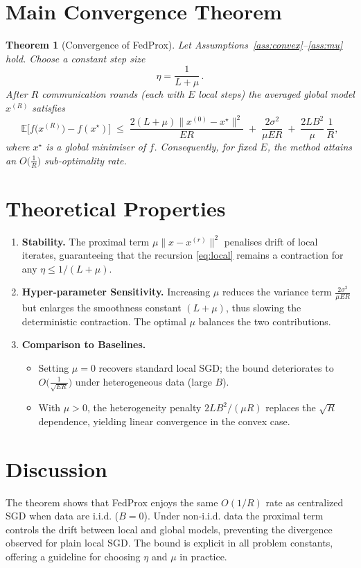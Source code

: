 \documentclass{article}
\newtheorem{theorem}{Theorem}
\newcommand{\E}{\mathbb{E}}
\begin{document}
\section*{Main Convergence Theorem}
\begin{theorem}[Convergence of FedProx]\label{thm:main}
Let Assumptions~\ref{ass:convex}–\ref{ass:mu} hold.  
Choose a constant step size
\[
\eta = \frac{1}{L+\mu}\, .
\]
After $R$ communication rounds (each with $E$ local steps) the averaged global model $x^{(R)}$ satisfies
\[
\E\!\big[ f\!\big(x^{(R)}\big)-f(x^\star) \big]
\;\le\;
\frac{2 (L+\mu)\|x^{(0)}-x^\star\|^2}{ER}
\;+\;
\frac{2\sigma^2}{\mu ER}
\;+\;
\frac{2L B^2}{\mu}\,\frac{1}{R},
\tag{3}
\]
where $x^\star$ is a global minimiser of $f$.  
Consequently, for fixed $E$, the method attains an $O\!\big(\tfrac{1}{R}\big)$ sub‑optimality rate.
\end{theorem}

\section*{Theoretical Properties}
\begin{enumerate}[label=\arabic*.]
\item \textbf{Stability.} The proximal term $\mu\|x-x^{(r)}\|^2$ penalises drift of local iterates, guaranteeing that the recursion \eqref{eq:local} remains a contraction for any $\eta\le1/(L+\mu)$.
\item \textbf{Hyper‑parameter Sensitivity.} Increasing $\mu$ reduces the variance term $\frac{2\sigma^2}{\mu ER}$ but enlarges the smoothness constant $(L+\mu)$, thus slowing the deterministic contraction. The optimal $\mu$ balances the two contributions.
\item \textbf{Comparison to Baselines.}
    \begin{itemize}
        \item Setting $\mu=0$ recovers standard local SGD; the bound deteriorates to $O\big(\tfrac{1}{\sqrt{ER}}\big)$ under heterogeneous data (large $B$).
        \item With $\mu>0$, the heterogeneity penalty $2L B^2/(\mu R)$ replaces the $\sqrt{R}$ dependence, yielding linear convergence in the convex case.
    \end{itemize}
\end{enumerate}

\section*{Discussion}
The theorem shows that FedProx enjoys the same $O(1/R)$ rate as centralized SGD when data are i.i.d. ($B=0$). Under non‑i.i.d. data the proximal term controls the drift between local and global models, preventing the divergence observed for plain local SGD. The bound is explicit in all problem constants, offering a guideline for choosing $\eta$ and $\mu$ in practice.
\end{document}
